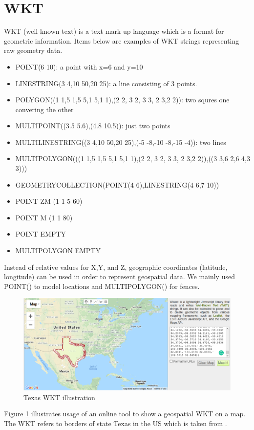 \documentclass[a4]{report}
\begin{document}
    \section{WKT}
    WKT (well known text) is a text mark up language which is a format for geometric information.
    Items below are examples of WKT strings representing raw geometry data.
    \begin{itemize}
        \item POINT(6 10): a point with x=6 and y=10
        \item LINESTRING(3 4,10 50,20 25): a line consisting of 3 points.
        \item POLYGON((1 1,5 1,5 5,1 5,1 1),(2 2, 3 2, 3 3, 2 3,2 2)): two squres one convering the other
        \item MULTIPOINT((3.5 5.6),(4.8 10.5)): just two points
        \item MULTILINESTRING((3 4,10 50,20 25),(-5 -8,-10 -8,-15 -4)): two lines
        \item MULTIPOLYGON(((1 1,5 1,5 5,1 5,1 1),(2 2, 3 2, 3 3, 2 3,2 2)),((3 3,6 2,6 4,3 3)))
        \item GEOMETRYCOLLECTION(POINT(4 6),LINESTRING(4 6,7 10))
        \item POINT ZM (1 1 5 60)
        \item POINT M (1 1 80)
        \item POINT EMPTY
        \item MULTIPOLYGON EMPTY
    \end{itemize}

    Instead of relative values for X,Y, and Z, geographic coordinates (latitude, longitude) can be used in order to
    represent geospatial data.
    We mainly used POINT() to model locations and MULTIPOLYGON() for fences.

    \begin{figure}[ht]
        \centering
        \caption{Texas WKT illustration}
        \label{fig:texas}
        \includegraphics[width=\linewidth, scale=0.5]{images/texas.png}
    \end{figure}
    Figure \ref{fig:texas} illustrates usage of an online tool \cite{WKTtool} to show a geospatial WKT on a map.
    The WKT refers to borders of state Texas in the US which is taken from \cite{WKTs}.
\end{document}
